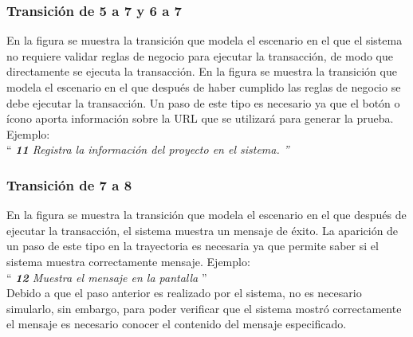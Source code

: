 
\subsubsection{Transición de 5 a 7 y 6 a 7} 
En la figura  se muestra la transición que modela el escenario en el que el sistema no requiere validar reglas de negocio para ejecutar la transacción, de modo que directamente se ejecuta la transacción.
En la figura  se muestra la transición que modela el escenario en el que después de haber cumplido las reglas de negocio se debe ejecutar la transacción.
Un paso de este tipo es necesario ya que el botón o ícono aporta información sobre la URL que se utilizará para generar la prueba. Ejemplo:\\

{``\it
    {\bf 11} \UCsist Registra la información del proyecto en el sistema.
''}\\
 

 \subsubsection{Transición de 7 a 8}
  
 En la figura  se muestra la transición que modela el escenario en el que después de ejecutar la transacción, el sistema muestra un mensaje de éxito. 
 La aparición de un paso de este tipo en la trayectoria es necesaria ya que  permite saber si el sistema muestra correctamente mensaje. Ejemplo:\\

 ``{\it
     {\bf 12} \UCsist Muestra el mensaje  en la pantalla 
 }''\\
	
 	Debido a que el paso anterior es realizado por el sistema, no es necesario simularlo, sin embargo, para poder verificar que el sistema mostró correctamente el mensaje es necesario conocer el contenido del mensaje especificado.
	